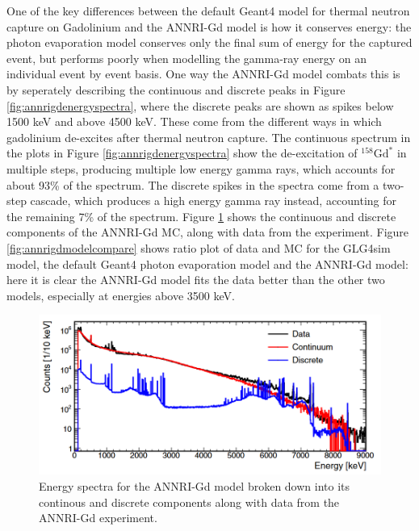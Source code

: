 One of the key differences between the default Geant4 model for thermal neutron capture on Gadolinium and the ANNRI-Gd model is how it conserves energy: the photon evaporation model conserves only the final sum of energy for the captured event, but performs poorly when modelling the gamma-ray energy on an individual event by event basis. One way the ANNRI-Gd model combats this is by seperately describing the continuous and discrete peaks in Figure \ref{fig:annrigdenergyspectra}, where the discrete peaks are shown as spikes below 1500 keV and above 4500 keV. These come from the different ways in which gadolinium de-excites after thermal neutron capture. The continuous spectrum in the plots in Figure \ref{fig:annrigdenergyspectra} show the de-excitation of ${ }^{158} \mathrm{Gd}^{*}$ in multiple steps, producing multiple low energy gamma rays, which accounts for about 93\% of the spectrum. The discrete spikes in the spectra come from a two-step cascade, which produces a high energy gamma ray instead, accounting for the remaining 7\% of the spectrum.
Figure \ref{fig:continousdiscrete} shows the continuous and discrete components of the ANNRI-Gd MC, along with data from the experiment. Figure \ref{fig:annrigdmodelcompare} shows ratio plot of data and MC for the GLG4sim model, the default Geant4 photon evaporation model and the ANNRI-Gd model: here it is clear the ANNRI-Gd model fits the data better than the other two models, especially at energies above 3500 keV. 

\begin{figure}
\includegraphics[width=\textwidth]{Figures/continousdiscrete.png}
\caption{Energy spectra for the ANNRI-Gd model broken down into its continous and discrete components along with data from the ANNRI-Gd experiment.}
\label{fig:continousdiscrete}
\end{figure}

